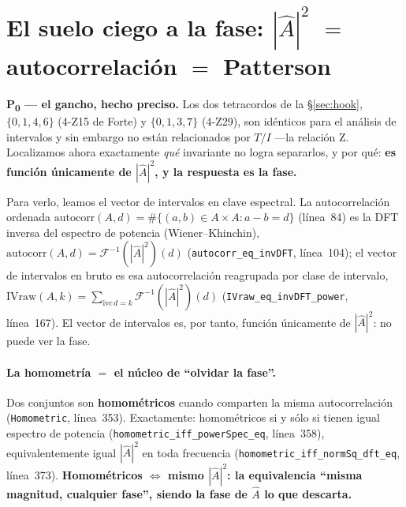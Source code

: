 \documentclass[11pt]{article}
\newcommand{\lean}[1]{\texttt{#1}}
\newcommand{\Ahat}{\hat{A}}
\newcommand{\Fi}{\mathcal{F}^{-1}}
\begin{document}
\section{El suelo ciego a la fase: \texorpdfstring{$|\Ahat|^2$}{|A|^2} \texorpdfstring{$=$}{=} autocorrelación \texorpdfstring{$=$}{=} Patterson}\label{sec:floor}

\noindent\textbf{P\textsubscript{0} --- el gancho, hecho preciso.} Los dos tetracordos de la
\S\ref{sec:hook}, $\{0,1,4,6\}$ (4-Z15 de Forte) y $\{0,1,3,7\}$ (4-Z29), son idénticos para el análisis de
intervalos y sin embargo no están relacionados por $T/I$ ---la relación Z. Localizamos ahora exactamente
\emph{qué} invariante no logra separarlos, y por qué: \textbf{es función únicamente de $|\Ahat|^2$, y la
respuesta es la fase.}

Para verlo, leamos el vector de intervalos en clave espectral. La autocorrelación ordenada
$\mathrm{autocorr}(A,d)=\#\{(a,b)\in A\times A: a-b=d\}$
(línea~84) es la DFT inversa del espectro de potencia (Wiener--Khinchin),
$\mathrm{autocorr}(A,d)=\Fi(|\Ahat|^2)(d)$ (\lean{autocorr\_eq\_invDFT}, línea~104); el vector de
intervalos en bruto es esa autocorrelación reagrupada por clase de intervalo,
$\mathrm{IVraw}(A,k)=\sum_{\mathrm{ivc}\,d=k}\Fi(|\Ahat|^2)(d)$ (\lean{IVraw\_eq\_invDFT\_power},
línea~167). El vector de intervalos es, por tanto, función únicamente de $|\Ahat|^2$: no puede ver la fase.

\paragraph{La homometría $=$ el núcleo de ``olvidar la fase''.} Dos conjuntos son \textbf{homométricos}
cuando comparten la misma autocorrelación (\lean{Homometric}, línea~353). Exactamente: homométricos si y
sólo si tienen igual espectro de potencia (\lean{homometric\_iff\_powerSpec\_eq}, línea~358),
equivalentemente igual $|\Ahat|^2$ en toda frecuencia (\lean{homometric\_iff\_normSq\_dft\_eq},
línea~373). \textbf{Homométricos $\iff$ mismo $|\Ahat|^2$: la equivalencia ``misma magnitud, cualquier
fase'', siendo la fase de $\Ahat$ lo que descarta.}
\end{document}

